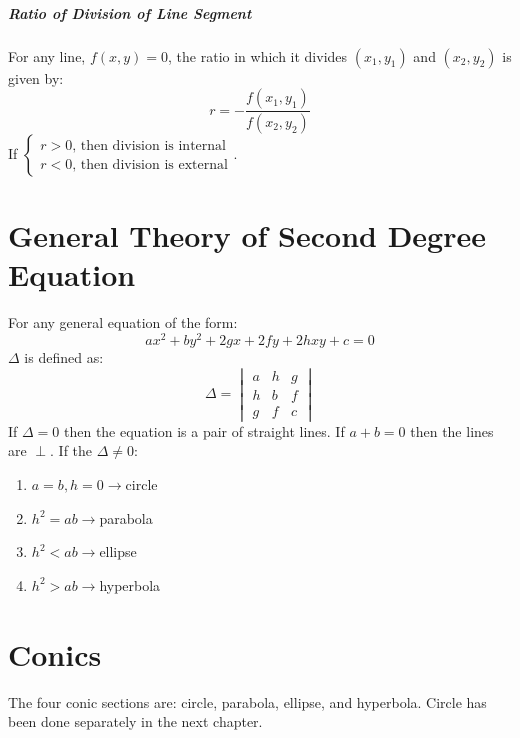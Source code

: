 \documentclass[openany, oneside]{book}
\begin{document}
\paragraph{Ratio of Division of Line Segment}
For any line, $f(x,y)=0$, the ratio in which it divides $(x_1,y_1)$ and $(x_2,y_2)$ is given by:
\begin{equation}
r=-\dfrac{f(x_1,y_1)}{f(x_2,y_2)}
\end{equation}
If $\begin{cases}r>0\text{, then division is internal}\\r<0\text{, then division is external}\end{cases}$.
\large{\chapter{General Theory of Second Degree Equation}}
For any general equation of the form:
\begin{equation}
ax^2+by^2+2gx+2fy+2hxy+c=0
\end{equation}
$\Delta$ is defined as:
\begin{equation}
\Delta=\begin{vmatrix}
a&h&g\\
h&b&f\\
g&f&c
\end{vmatrix}
\end{equation}
If $\Delta=0$ then the equation is a pair of straight lines. If $a+b=0$ then the lines are $\perp$.\newline
If the $\Delta \neq 0$:
\begin{enumerate}
\item $a=b, h=0\rightarrow$circle
\item $h^2=ab\rightarrow$parabola
\item $h^2<ab\rightarrow$ellipse
\item $h^2>ab\rightarrow$hyperbola
\end{enumerate}

\large{\chapter{Conics}}
The four conic sections are: circle, parabola, ellipse, and hyperbola. Circle has been done separately in the next chapter.
\end{document}
